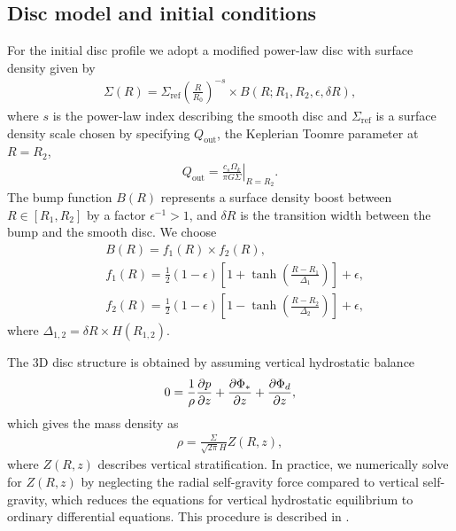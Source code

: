 \subsection{Disc model and initial conditions}
For the initial disc profile we adopt a modified power-law disc with
surface density given by
\begin{align}
  \Sigma(R) = \Sigma_\mathrm{ref} \left(\frac{R}{R_0}\right)^{-s}\times B(R;
  R_{1}, R_{2}, \epsilon, \delta R), 
\end{align}
where $s$ is the power-law index describing the smooth disc and
$\Sigma_\mathrm{ref}$ is a 
surface density scale chosen by specifying $Q_\mathrm{out}$,
the Keplerian Toomre parameter at $R=R_{2}$,
\begin{align}
  Q_\mathrm{out} = \left.\frac{c_s\Omega_k}{\pi G
    \Sigma}\right|_{R=R_{2}}. 
\end{align}
The bump function
$B(R)$ represents a surface density boost between
$R\in[R_{1},R_{2}]$ by a factor $\epsilon^{-1}>1$,
and $\delta R$ is the transition width between the bump and the
smooth disc. We choose 
\begin{align}\label{sig_bump}
  &B(R) = f_1(R)\times f_2(R),\\
  &f_1(R) = \frac{1}{2}\left(1 - \epsilon\right)\left[1 +
    \tanh\left(\frac{R-R_{1}}{\Delta_1}\right)\right]  + \epsilon,\\
  &f_2(R) = \frac{1}{2}\left(1 - \epsilon\right)\left[1 -
    \tanh\left(\frac{R-R_{2}}{\Delta_2}\right)\right]  + \epsilon,
\end{align}
where $\Delta_{1,2} = \delta R \times H(R_{1,2})$. 

The 3D disc structure is obtained by assuming vertical hydrostatic
balance  
\begin{align}
  0 = \frac{1}{\rho}\frac{\partial p}{\partial z} + \frac{\partial\Phi_*}{\partial z} + \frac{\partial
    \Phi_d}{\partial z},  
\end{align}
which gives the mass density as 
\begin{align}
  \rho = \frac{\Sigma}{\sqrt{2\pi}H}Z(R,z),
\end{align}
where $Z(R,z)$ describes vertical stratification. In practice, we
numerically solve for $Z(R,z)$ by neglecting the radial self-gravity
force compared to vertical self-gravity, which reduces the equations
for vertical hydrostatic equilibrium to ordinary differential
equations. This procedure is described in \cite{lin12b}. 


